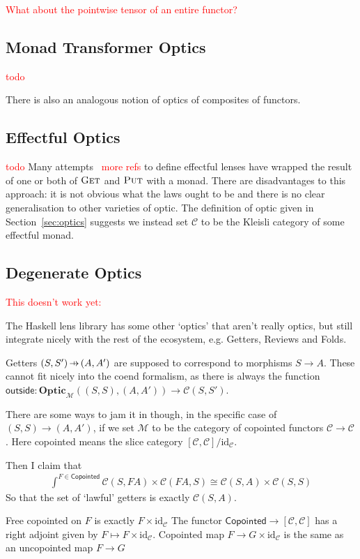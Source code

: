 \documentclass[11pt,a4paper]{article}
\theoremstyle{plain}
\theoremstyle{definition}
\newcommand{\C}{\mathscr{C}}
\newcommand{\M}{\mathscr{M}}
\newcommand{\Optic}{\mathbf{Optic}}
\newcommand{\id}{\mathrm{id}}
\newcommand{\fget}{\textsc{Get}}
\newcommand{\fput}{\textsc{Put}}
\newcommand{\outside}{\mathsf{outside}}
\newcommand{\hto}{\ensuremath{\,\mathaccent\shortmid\rightarrow\,}}
\newcommand{\todo}[1]{\textcolor{red}{\small #1}}
\begin{document}
\todo{What about the pointwise tensor of an entire functor?}

\subsection{Monad Transformer Optics}

\todo{todo}

There is also an analogous notion of optics of composites of functors.

\subsection{Effectful Optics}
\todo{todo}
Many attempts~\cite{ReflectionsOnMonadicLenses} \todo{more refs} to define effectful lenses have wrapped the result of one or both of $\fget$ and $\fput$ with a monad. There are disadvantages to this approach: it is not obvious what the laws ought to be and there is no clear generalisation to other varieties of optic. The definition of optic given in Section~\ref{sec:optics} suggests we instead set $\C$ to be the Kleisli category of some effectful monad.

\subsection{Degenerate Optics}
\todo{This doesn't work yet:}

The Haskell lens library has some other `optics' that aren't really optics, but still integrate nicely with the rest of the ecosystem, e.g. Getters, Reviews and Folds.

Getters $(S, S') \hto (A, A')$ are supposed to correspond to morphisms $S \to A$. These cannot fit nicely into the coend formalism, as there is always the function $\outside : \Optic_\M((S, S), (A, A')) \to \C(S, S')$.

There are some ways to jam it in though, in the specific case of $(S, S) \to (A, A')$, if we set $\M$ to be the category of copointed functors $\C \to \C$. Here copointed means the slice category $[\C, \C] / \id_\C$.

Then I claim that
\begin{align*}
  \int^{F \in \mathsf{Copointed}} \C(S, FA) \times \C(FA, S) \cong \C(S, A) \times \C(S, S)
\end{align*}
So that the set of `lawful' getters is exactly $\C(S, A)$.

Free copointed on $F$ is exactly $F \times \id_\C$
The functor $\mathsf{Copointed} \to [\C, \C]$ has a right adjoint given by $F \mapsto F \times \id_\C$. Copointed map $F \to G \times \id_\C$ is the same as an uncopointed map $F \to G$
\end{document}
